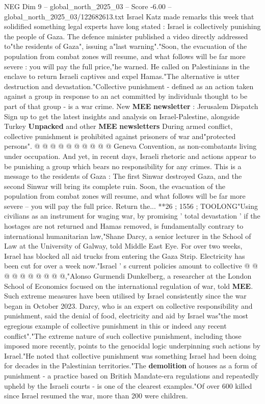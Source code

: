 \begin{textsample}{NEG Dim 9 – global\_north\_2025\_03 – Score -6.00 – global\_north\_2025\_03/122682613.txt}  \label{ex:f9_neg_072}
Israel Katz made remarks this week that solidified something legal experts have long stated : Israel is collectively punishing the people of Gaza.
The defence minister published a video directly addressed to"the residents of Gaza", issuing a"last warning"."Soon, the evacuation of the population from combat zones will resume, and what follows will be far more severe : you will pay the full price,"he warned.
He called on Palestinians in the enclave to return Israeli captives and expel Hamas."The alternative is utter destruction and devastation."Collective punishment - defined as an action taken against a group in response to an act committed by individuals thought to be part of that group - is a war crime.
New \textbf{MEE} \textbf{newsletter} : Jerusalem Dispatch Sign up to get the latest insights and analysis on Israel-Palestine, alongside Turkey \textbf{Unpacked} and other \textbf{MEE} \textbf{newsletters} During armed conflict, collective punishment is prohibited against prisoners of war and"protected persons". @ @ @ @ @ @ @ @ @ @ Geneva Convention, as non-combatants living under occupation.
And yet, in recent days, Israeli rhetoric and actions appear to be punishing a group which bears no responsibility for any crimes.
This is a message to the residents of Gaza : The first Sinwar destroyed Gaza, and the second Sinwar will bring its complete ruin.
Soon, the evacuation of the population from combat zones will resume, and what follows will be far more severe -- you will pay the full price.
Return the... **26 ; 1556 ; TOOLONG"Using civilians as an instrument for waging war, by promising ' total devastation ' if the hostages are not returned and Hamas removed, is fundamentally contrary to international humanitarian law,"Shane Darcy, a senior lecturer in the School of Law at the University of Galway, told Middle East Eye.
For over two weeks, Israel has blocked all aid trucks from entering the Gaza Strip.
Electricity has been cut for over a week now."Israel ' s current policies amount to collective @ @ @ @ @ @ @ @ @ @,"Alonso Gurmendi Dunkelberg, a researcher at the London School of Economics focused on the international regulation of war, told \textbf{MEE}.
Such extreme measures have been utilised by Israel consistently since the war began in October 2023.
Darcy, who is an expert on collective responsibility and punishment, said the denial of food, electricity and aid by Israel was"the most egregious example of collective punishment in this or indeed any recent conflict"."The extreme nature of such collective punishment, including those imposed more recently, points to the genocidal logic underpinning such actions by Israel."He noted that collective punishment was something Israel had been doing for decades in the Palestinian territories."The \textbf{demolition} of houses as a form of punishment - a practice based on British Mandate-era regulations and repeatedly upheld by the Israeli courts - is one of the clearest examples."Of over 600 killed since Israel resumed the war, more than 200 were children.

\end{textsample}
